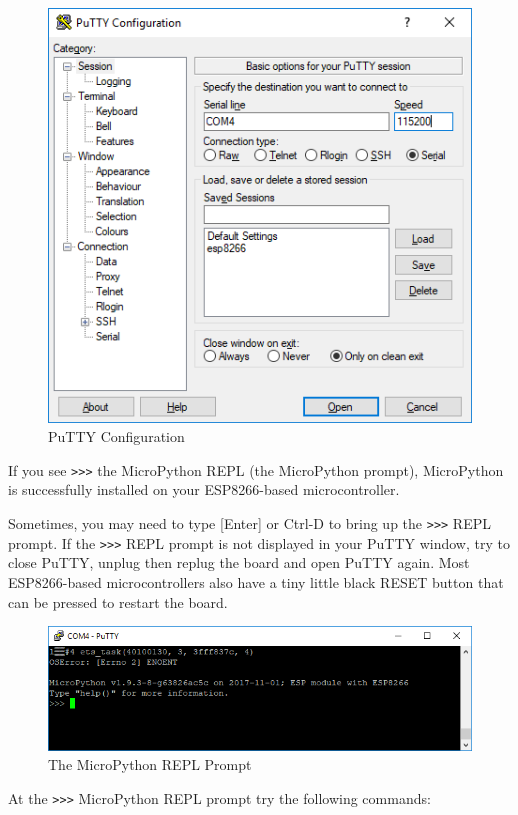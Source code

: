 \documentclass{book}
\makeatletter
\def\maxwidth{\ifdim\Gin@nat@width>\linewidth\linewidth
    \else\Gin@nat@width\fi}
\let\Oldincludegraphics\includegraphics
\renewcommand{\includegraphics}[1]{\Oldincludegraphics[width=.8\maxwidth]{#1}}
\makeatother
\begin{document}
\begin{figure}
\centering
\includegraphics{images/putty_config.PNG}
\caption{PuTTY Configuration}
\end{figure}

If you see \lstinline!>>>! the MicroPython REPL (the MicroPython
prompt), MicroPython is successfully installed on your ESP8266-based
microcontroller.

Sometimes, you may need to type {[}Enter{]} or Ctrl-D to bring up the
\lstinline!>>>! REPL prompt. If the \lstinline!>>>! REPL prompt is not
displayed in your PuTTY window, try to close PuTTY, unplug then replug
the board and open PuTTY again. Most ESP8266-based microcontrollers also
have a tiny little black RESET button that can be pressed to restart the
board.

\begin{figure}
\centering
\includegraphics{images/REPL_prompt.PNG}
\caption{The MicroPython REPL Prompt}
\end{figure}

At the \lstinline!>>>! MicroPython REPL prompt try the following
commands:
\end{document}
